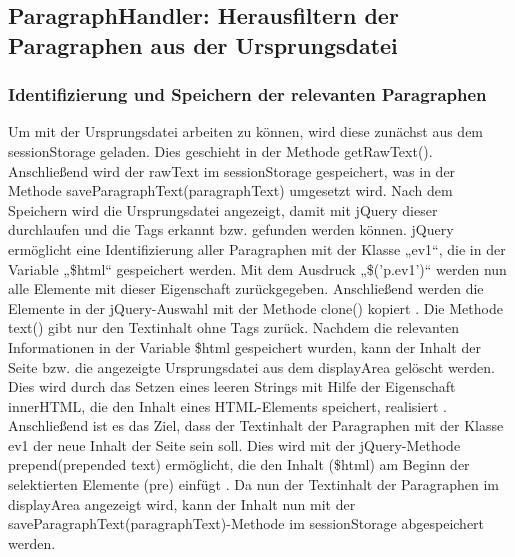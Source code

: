 \subsection{ParagraphHandler: Herausfiltern der Paragraphen aus der Ursprungsdatei}

\subsubsection{Identifizierung und Speichern der relevanten Paragraphen}
Um mit der Ursprungsdatei arbeiten zu können, wird diese zunächst aus dem sessionStorage geladen. Dies geschieht in der Methode getRawText(). Anschließend wird der rawText im sessionStorage gespeichert, was in der Methode saveParagraphText(paragraphText) umgesetzt wird. Nach dem Speichern wird die Ursprungsdatei angezeigt, damit mit jQuery dieser durchlaufen und die Tags erkannt bzw. gefunden werden können. jQuery ermöglicht eine Identifizierung aller Paragraphen mit der Klasse „ev1“, die in der Variable „\$html“ gespeichert werden. Mit dem Ausdruck „\$('p.ev1')“ werden nun alle Elemente mit dieser Eigenschaft zurückgegeben. Anschließend werden die Elemente in der jQuery-Auswahl mit der Methode clone() kopiert \cite{clone}. Die Methode text() gibt nur den Textinhalt ohne Tags zurück. Nachdem die relevanten Informationen in der Variable \$html gespeichert wurden, kann der Inhalt der Seite bzw. die angezeigte Ursprungsdatei aus dem displayArea gelöscht werden. Dies wird durch das Setzen eines leeren Strings mit Hilfe der Eigenschaft innerHTML, die den Inhalt eines HTML-Elements speichert, realisiert \cite{innerhtml}. Anschließend ist es das Ziel, dass der Textinhalt der Paragraphen mit der Klasse ev1 der neue Inhalt der Seite sein soll. Dies wird mit der jQuery-Methode prepend(prepended text) ermöglicht, die den Inhalt (\$html) am Beginn der selektierten Elemente (pre) einfügt \cite{prepend}. Da nun der Textinhalt der Paragraphen im displayArea angezeigt wird, kann der Inhalt nun mit der saveParagraphText(paragraphText)-Methode im sessionStorage abgespeichert werden.

